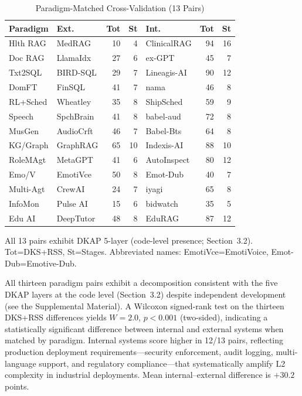 \documentclass[fleqn,10pt,lineno]{wlpeerj}
\begin{document}
\begin{table}[H]
\centering
\caption{Paradigm-Matched Cross-Validation (13 Pairs)}
\label{tab:crossval}
\footnotesize
\begin{tabularx}{\columnwidth}{@{}lXrrXrr@{}}
\toprule
\textbf{Paradigm} & \textbf{Ext.} & \textbf{Tot} & \textbf{St} & \textbf{Int.} & \textbf{Tot} & \textbf{St} \\
\midrule
Hlth RAG    & MedRAG      & 10 &  4 & ClinicalRAG & 94 & 16 \\
Doc RAG     & LlamaIdx    & 27 &  6 & ex-GPT      & 45 &  7 \\
Txt2SQL     & BIRD-SQL    & 29 &  7 & Lineagis-AI & 90 & 12 \\
DomFT       & FinSQL      & 41 &  7 & nama        & 46 &  8 \\
RL+Sched    & Wheatley    & 35 &  8 & ShipSched   & 59 &  9 \\
Speech      & SpchBrain   & 41 &  8 & babel-aud   & 72 &  8 \\
MusGen      & AudioCrft   & 46 &  7 & Babel-Bts   & 64 &  8 \\
KG/Graph    & GraphRAG    & 65 & 10 & Indexis-AI  & 88 & 10 \\
RoleMAgt    & MetaGPT     & 41 &  6 & AutoInspect & 80 & 12 \\
Emo/V       & EmotiVce    & 50 &  8 & Emot-Dub    & 40 &  7 \\
Multi-Agt   & CrewAI      & 24 &  7 & iyagi       & 65 &  8 \\
InfoMon     & Pulse AI    & 15 &  6 & bidwatch    & 35 &  5 \\
Edu AI      & DeepTutor   & 48 &  8 & EduRAG      & 87 & 12 \\
\bottomrule
\end{tabularx}
\par\smallskip
{\footnotesize All 13 pairs exhibit DKAP 5-layer (code-level presence; Section~3.2). Tot=DKS+RSS, St=Stages. Abbreviated names: EmotiVce=EmotiVoice, Emot-Dub=Emotive-Dub.\par}
\end{table}

All thirteen paradigm pairs exhibit a decomposition consistent with the five DKAP layers at the code level (Section~3.2) despite independent development (see the Supplemental Material). A Wilcoxon signed-rank test on the thirteen DKS+RSS differences yields $W = 2.0$, $p < 0.001$ (two-sided), indicating a statistically significant difference between internal and external systems when matched by paradigm. Internal systems score higher in 12/13 pairs, reflecting production deployment requirements---security enforcement, audit logging, multi-language support, and regulatory compliance---that systematically amplify L2 complexity in industrial deployments. Mean internal--external difference is $+30.2$ points.
\end{document}
